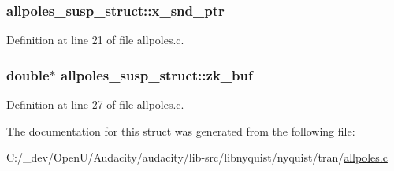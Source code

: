 \subsubsection[{\texorpdfstring{x\+\_\+snd\+\_\+ptr}{x_snd_ptr}}]{ allpoles\+\_\+susp\+\_\+struct\+::x\+\_\+snd\+\_\+ptr}\hypertarget{structallpoles__susp__struct_aea5dfcb7280aab786a437d7157f22f6f}{}\label{structallpoles__susp__struct_aea5dfcb7280aab786a437d7157f22f6f}


Definition at line 21 of file allpoles.\+c.

\subsubsection[{\texorpdfstring{zk\+\_\+buf}{zk_buf}}]{\setlength{\rightskip}{0pt plus 5cm}double$\ast$ allpoles\+\_\+susp\+\_\+struct\+::zk\+\_\+buf}\hypertarget{structallpoles__susp__struct_a47455dbded9afab370b62a2efd3f8690}{}\label{structallpoles__susp__struct_a47455dbded9afab370b62a2efd3f8690}


Definition at line 27 of file allpoles.\+c.



The documentation for this struct was generated from the following file\+:\begin{DoxyCompactItemize}
\item 
C\+:/\+\_\+dev/\+Open\+U/\+Audacity/audacity/lib-\/src/libnyquist/nyquist/tran/\hyperlink{allpoles_8c}{allpoles.\+c}\end{DoxyCompactItemize}
